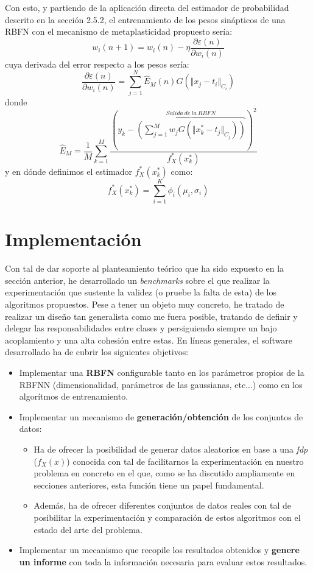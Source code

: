\documentclass[10pt,a4paper]{report}
\begin{document}
Con esto, y partiendo de la aplicación directa del estimador de probabilidad descrito en la sección 2.5.2, el entrenamiento de los pesos sinápticos de una RBFN con el mecanismo de metaplasticidad propuesto sería:
\begin{equation}
	w_i(n+1)=w_i(n) - \eta \dfrac{\partial\varepsilon(n)}{\partial w_i(n)}
\end{equation} 
cuya derivada del error respecto a los pesos sería:
\begin{equation}
	\dfrac{\partial\varepsilon(n)}{\partial w_i(n)} = \sum^N_{j=1}{\widehat{E}_M(n) G(\Vert x_j - t_i \Vert_{C_i})}
\end{equation}
donde
\begin{equation}
	\widehat{E}_M=\dfrac{1}{M}\sum^M_{k=1}\dfrac{(y_k - \overbrace{\left(\sum^M_{j=1}{w_j G(\Vert x^*_k - t_j \Vert_{C_j})}\right)}^{Salida\ de\ la\ RBFN})^2}{f^*_X(x^*_k)}
\end{equation}
y en dónde definimos el estimador $f^*_X(x^*_k)$ como:
\begin{equation}
	f^*_X(x^*_k) = \sum^K_{i=1}\phi_i(\mu_i,\sigma_i)
\end{equation}


\chapter{Implementación}
Con tal de dar soporte al planteamiento teórico que ha sido expuesto en la sección anterior, he desarrollado un \textit{benchmarks} sobre el que realizar la experimentación que sustente la validez (o pruebe la falta de esta) de los algoritmos propuestos. Pese a tener un objeto muy concreto, he tratado de realizar un diseño tan generalista como me fuera posible, tratando de definir y delegar las responsabilidades entre clases y persiguiendo siempre un bajo acoplamiento y una alta cohesión entre estas.
En líneas generales, el software desarrollado ha de cubrir los siguientes objetivos:
\begin{itemize}
	\item Implementar una \textbf{RBFN} configurable tanto en los parámetros propios de la RBFNN (dimensionalidad, parámetros de las gaussianas, etc...) como en los algorítmos de entrenamiento.
	\item Implementar un mecanismo de \textbf{generación/obtención} de los conjuntos de datos:
	\begin{itemize}
		\item Ha de ofrecer la posibilidad de generar datos aleatorios en base a una \textit{fdp} ($f_X(x)$) conocida con tal de facilitarnos la experimentación en nuestro problema en concreto en el que, como se ha discutido ampliamente en secciones anteriores, esta función tiene un papel fundamental.
		\item Además, ha de ofrecer diferentes conjuntos de datos reales con tal de posibilitar la experimentación y comparación de estos algoritmos con el estado del arte del problema.
	\end{itemize}
	\item Implementar un mecanismo que recopile los resultados obtenidos y \textbf{genere un informe} con toda la información necesaria para evaluar estos resultados.
\end{itemize}
\end{document}
